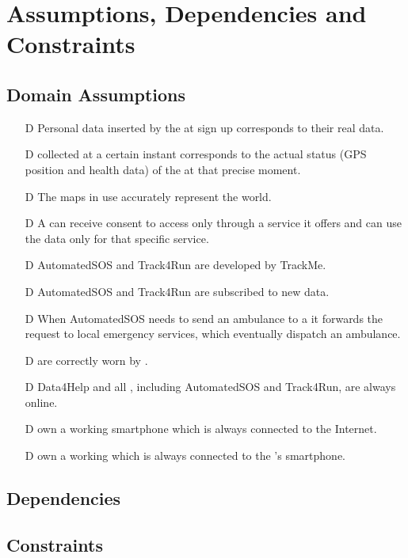 \documentclass[../../rasd.tex]{subfiles}
\begin{document}
\section{Assumptions, Dependencies and Constraints}
		\subsection{Domain Assumptions}
			 	\begin{itemize}
				 	\item[D\subs{1}]Personal data inserted by the  at sign up corresponds to their real data.
					\item[D\subs{2}] collected at a certain instant corresponds to the actual status (GPS position and health data) of the  at that precise moment.				
					\item[D\subs{3}]The maps in use accurately represent the world.
					\item[D\subs{4}]A  can receive consent to  access only through a service it offers and can use the data only for that specific service.
					\item[D\subs{5}]AutomatedSOS and Track4Run are  developed by TrackMe.
					\item[D\subs{6}]AutomatedSOS and Track4Run are subscribed to new data.
					\item[D\subs{7}]When AutomatedSOS needs to send an ambulance to a  it forwards the request to local emergency services, which eventually dispatch an ambulance.
					\item[D\subs{8}] are correctly worn by .
					\item[D\subs{9}]Data4Help and all , including AutomatedSOS and Track4Run, are always online.
					\item[D\subs{10}] own a working smartphone which is always connected to the Internet.
					\item[D\subs{11}] own a working  which is always connected to the 's smartphone.
				\end{itemize}	
		\subsection{Dependencies}
		\subsection{Constraints}
\end{document}

